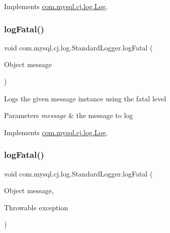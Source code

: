 Implements \mbox{\hyperlink{interfacecom_1_1mysql_1_1cj_1_1log_1_1_log_a96aab6e63a2ab9ebe3b640b7e253dd4f}{com.\+mysql.\+cj.\+log.\+Log}}.

\mbox{\label{classcom_1_1mysql_1_1cj_1_1log_1_1_standard_logger_af6f7c3848e7c6df645dd52b95b312aaa}} 
\subsubsection{\texorpdfstring{log\+Fatal()}{logFatal()}\hspace{0.1cm}{\footnotesize\ttfamily [1/2]}}
{\footnotesize\ttfamily void com.\+mysql.\+cj.\+log.\+Standard\+Logger.\+log\+Fatal (\begin{DoxyParamCaption}\item[{Object}]{message }\end{DoxyParamCaption})}

Logs the given message instance using the \textquotesingle{}fatal\textquotesingle{} level


\begin{DoxyParams}{Parameters}
{\em message} & the message to log \\
\hline
\end{DoxyParams}


Implements \mbox{\hyperlink{interfacecom_1_1mysql_1_1cj_1_1log_1_1_log_a4f36fdcde6b1c88a4f1ba25a70555e3f}{com.\+mysql.\+cj.\+log.\+Log}}.

\mbox{\label{classcom_1_1mysql_1_1cj_1_1log_1_1_standard_logger_a69e98cb3f558bb0403c602a83dbb515c}} 
\subsubsection{\texorpdfstring{log\+Fatal()}{logFatal()}\hspace{0.1cm}{\footnotesize\ttfamily [2/2]}}
{\footnotesize\ttfamily void com.\+mysql.\+cj.\+log.\+Standard\+Logger.\+log\+Fatal (\begin{DoxyParamCaption}\item[{Object}]{message,  }\item[{Throwable}]{exception }\end{DoxyParamCaption})}

